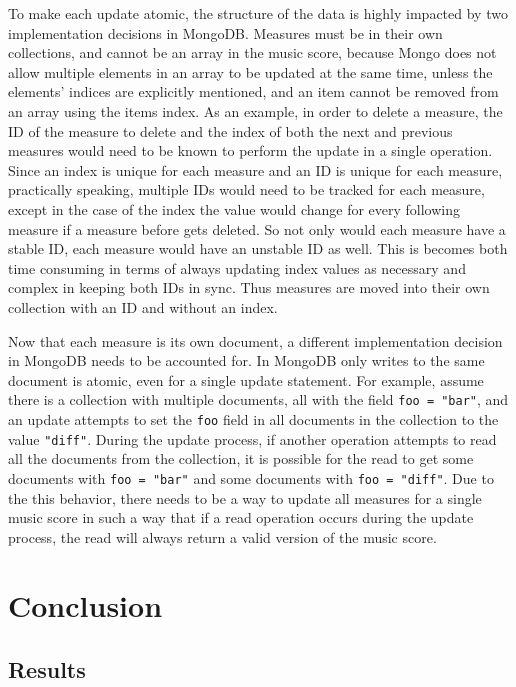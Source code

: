 \documentclass[letterpaper,12pt]{article}
\begin{document}
To make each update atomic, the structure of the data is highly impacted by two implementation decisions in MongoDB.
Measures must be in their own collections, and cannot be an array in the music score, because Mongo does not allow
multiple elements in an array to be updated at the same time, unless the elements' indices are explicitly mentioned, and
an item cannot be removed from an array using the items index. As an example, in order to delete a measure, the ID of
the measure to delete and the index of both the next and previous measures would need to be known to perform the update
in a single operation. Since an index is unique for each measure and an ID is unique for each measure, practically
speaking, multiple IDs would need to be tracked for each measure, except in the case of the index the value would change
for every following measure if a measure before gets deleted. So not only would each measure have a stable ID, each
measure would have an unstable ID as well. This is becomes both time consuming in terms of always updating index values
as necessary and complex in keeping both IDs in sync. Thus measures are moved into their own collection with an ID and
without an index.

Now that each measure is its own document, a different implementation decision in MongoDB needs to be accounted for. In
MongoDB only writes to the same document is atomic, even for a single update statement. For example, assume there is a 
collection with multiple documents, all with the field \lstinline{foo = "bar"}, and an update attempts to set the
\lstinline{foo} field in all documents in the collection to the value \lstinline{"diff"}. During the update process, if
another operation attempts to read all the documents from the collection, it is possible for the read to get some 
documents with \lstinline{foo = "bar"} and some documents with \lstinline{foo = "diff"}. Due to the this behavior, there
needs to be a way to update all measures for a single music score in such a way that if a read operation occurs during
the update process, the read will always return a valid version of the music score.

\section{Conclusion}

\subsection{Results}
\end{document}
